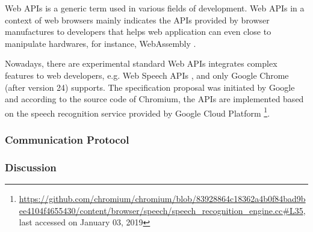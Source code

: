 Web APIs is a generic term used in various fields of development.
Web APIs in a context of web browsers mainly indicates the APIs provided
by browser manufactures to developers that helps web application can even close
to manipulate hardwares, for instance, WebAssembly \cite{w3c2018ws}.

Nowadays, there are experimental standard Web APIs integrates complex features to web developers, e.g. Web Speech APIs \cite{mozilla2019speech}, and only Google Chrome (after version 24) supports. The specification proposal was initiated by Google and according to the source code of Chromium, the APIs are implemented based on the speech recognition service provided by Google Cloud Platform \footnote{\url{https://github.com/chromium/chromium/blob/83928864c18362a4b0f84bad9bee4104f4655430/content/browser/speech/speech\_recognition\_engine.cc\#L35}, last accessed on January 03, 2019}.

\subsubsection{Communication Protocol}

\subsubsection{Discussion}

\cleardoublepage